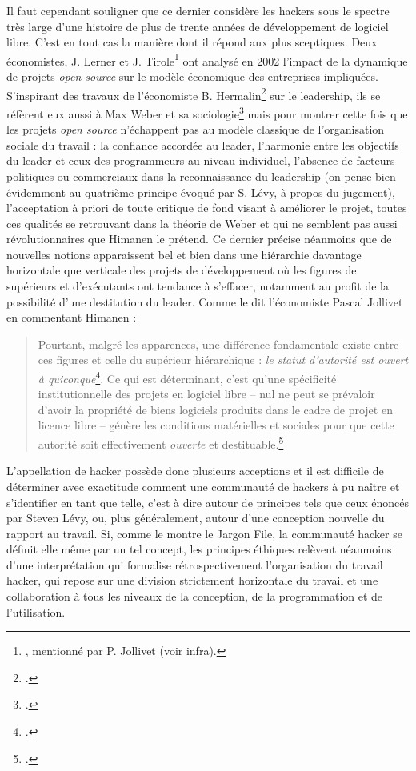 \documentclass{FramateX}
\begin{document}
\begin{refsection}
Il faut cependant souligner que ce dernier considère les hackers sous le
spectre très large d'une histoire de plus de trente
années de développement de logiciel libre. C'est en
tout cas la manière dont il répond aux plus sceptiques. Deux
économistes, J. Lerner et J. Tirole\footnote{\cite{lernersimple2002}, mentionné par P. Jollivet (voir infra).} ont analysé en 2002 l'impact de la
dynamique de projets \textit{open source} sur le modèle économique des
entreprises impliquées. S'inspirant des travaux de
l'économiste B. Hermalin\footnote{\cite{hermalintowards1998}.} sur le
leadership, ils se réfèrent eux aussi à Max Weber et sa
sociologie\footnote{\cite{webereconomie1971}.}
mais pour montrer cette fois que les projets \textit{open source}
n'échappent pas au modèle classique de
l'organisation sociale du travail : la confiance
accordée au leader, l'harmonie entre les objectifs du
leader et ceux des programmeurs au niveau individuel,
l'absence de facteurs politiques ou commerciaux dans
la reconnaissance du leadership (on pense bien évidemment au quatrième
principe évoqué par S. Lévy, à propos du jugement),
l'acceptation à priori de toute critique de fond
visant à améliorer le projet, toutes ces qualités se retrouvant dans la
théorie de Weber et qui ne semblent pas aussi révolutionnaires que
Himanen le prétend. Ce dernier précise néanmoins que de nouvelles
notions apparaissent bel et bien dans une hiérarchie davantage
horizontale que verticale des projets de développement où les figures
de supérieurs et d'exécutants ont tendance à
s'effacer, notamment au profit de la possibilité
d'une destitution du leader. Comme le dit
l'économiste Pascal Jollivet en commentant Himanen :
\begin{quote}
Pourtant, malgré les apparences, une différence fondamentale existe
entre ces figures et celle du supérieur hiérarchique : \textit{le
statut d'autorité est ouvert à
quiconque}\footnote{\cite[p.~80]{himanenethique2001}.}. Ce qui est
déterminant, c'est qu'une spécificité
institutionnelle des projets en logiciel libre -- nul ne peut se
prévaloir d'avoir la propriété de biens logiciels
produits dans le cadre de projet en licence libre -- génère les
conditions matérielles et sociales pour que cette autorité soit
effectivement \textit{ouverte} et
destituable.\footnote{\cite[p.~165]{jollivetlethique2002}.}
\end{quote}
L'appellation de hacker possède donc plusieurs
acceptions et il est difficile de déterminer avec exactitude comment
une communauté de hackers à pu naître et s'identifier
en tant que telle, c'est à dire autour de principes
tels que ceux énoncés par Steven Lévy, ou, plus généralement, autour
d'une conception nouvelle du rapport au travail. Si,
comme le montre le Jargon File, la communauté hacker se définit elle
même par un tel concept, les principes éthiques relèvent néanmoins
d'une interprétation qui formalise rétrospectivement
l'organisation du travail hacker, qui repose sur une division
strictement horizontale du travail et une collaboration à tous les
niveaux de la conception, de la programmation et de l'utilisation.


\end{refsection}
\end{document}
